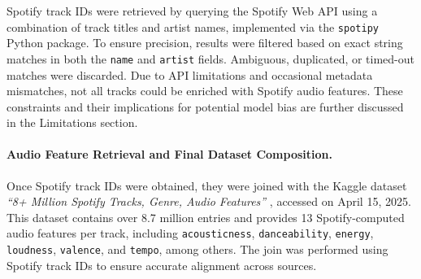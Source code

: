 \documentclass{article}
\begin{document}
Spotify track IDs were retrieved by querying the Spotify Web API \parencite{SpotifyAPI} using a combination of track titles and artist names, implemented via the \texttt{spotipy} Python package. To ensure precision, results were filtered based on exact string matches in both the \texttt{name} and \texttt{artist} fields. Ambiguous, duplicated, or timed-out matches were discarded. Due to API limitations and occasional metadata mismatches, not all tracks could be enriched with Spotify audio features. These constraints and their implications for potential model bias are further discussed in the Limitations section.

\paragraph{Audio Feature Retrieval and Final Dataset Composition.}

Once Spotify track IDs were obtained, they were joined with the Kaggle dataset \textit{“8+ Million Spotify Tracks, Genre, Audio Features”} \parencite{GrosseMalte2022}, accessed on April 15, 2025. This dataset contains over 8.7 million entries and provides 13 Spotify-computed audio features per track, including \texttt{acousticness}, \texttt{danceability}, \texttt{energy}, \texttt{loudness}, \texttt{valence}, and \texttt{tempo}, among others. The join was performed using Spotify track IDs to ensure accurate alignment across sources.

\begin{table}[H]
\centering
{}
\caption{Sample entries from the Kaggle \texttt{audio\_features} table.}
\end{table}
\end{document}
